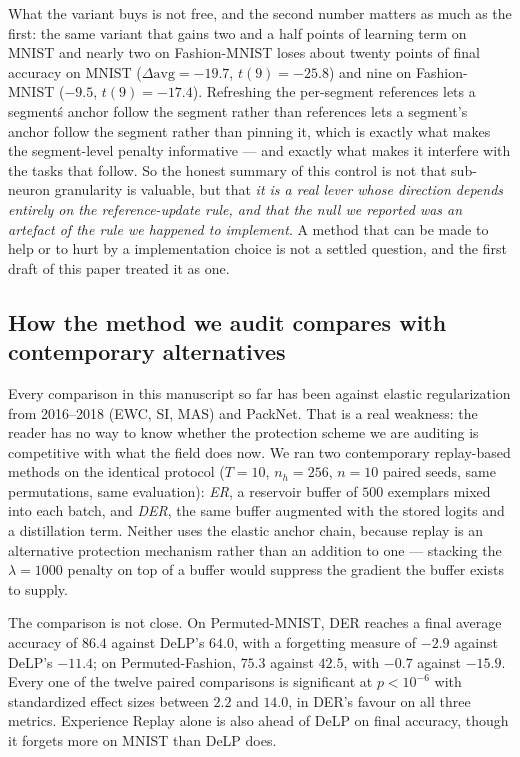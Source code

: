 \documentclass[review,12pt,number]{elsarticle}
\begin{document}
What the variant buys is not free, and the second number matters as much
as the first: the same variant that gains two and a half points of
learning term on MNIST and nearly two on Fashion-MNIST loses about twenty
points of final accuracy on MNIST ($\Delta\mathrm{avg}=-19.7$,
$t(9)=-25.8$) and nine on Fashion-MNIST ($-9.5$, $t(9)=-17.4$). Refreshing the per-segment
references lets a segment\'s anchor follow the segment rather than
references lets a segment's anchor follow the segment rather than
pinning it, which is exactly what makes the segment-level penalty
informative --- and exactly what makes it interfere with the tasks that
follow. So the honest summary of this control is not that
sub-neuron granularity is valuable, but that \emph{it is a real lever
whose direction depends entirely on the reference-update rule, and that
the null we reported was an artefact of the rule we happened to
implement}. A method that can be made to help or to hurt by a
implementation choice is not a settled question, and the first draft of
this paper treated it as one.

\subsection{How the method we audit compares with contemporary
alternatives}
\label{sec:ctrl-baselines}

Every comparison in this manuscript so far has been against elastic
regularization from 2016--2018 (EWC, SI, MAS) and PackNet. That is a
real weakness: the reader has no way to know whether the protection
scheme we are auditing is competitive with what the field does now. We
ran two contemporary replay-based methods on the identical protocol
($T=10$, $n_h{=}256$, $n=10$ paired seeds, same permutations, same
evaluation): \emph{ER}, a reservoir buffer of $500$ exemplars mixed into
each batch, and \emph{DER}, the same buffer augmented with the stored
logits and a distillation term. Neither uses the elastic anchor chain,
because replay is an alternative protection mechanism rather than an
addition to one --- stacking the $\lambda=1000$ penalty on top of a
buffer would suppress the gradient the buffer exists to supply.

The comparison is not close. On Permuted-MNIST, DER reaches a final
average accuracy of $86.4$ against DeLP's $64.0$, with a forgetting
measure of $-2.9$ against DeLP's $-11.4$; on Permuted-Fashion, $75.3$
against $42.5$, with $-0.7$ against $-15.9$. Every one of the twelve
paired comparisons is significant at $p<10^{-6}$ with standardized effect
sizes between $2.2$ and $14.0$, in DER's favour on all three metrics.
Experience Replay alone is also ahead of DeLP on final accuracy, though
it forgets more on MNIST than DeLP does.
\end{document}
